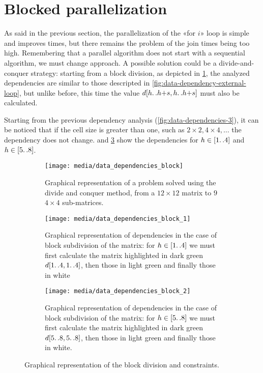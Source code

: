 \section{Blocked parallelization}\label{blocked_parallelization}

As said in the previous section, the parallelization of the «for \(i\)» loop is simple and improves times, but there remains the problem of the join times being too high. 
Remembering that a parallel algorithm does not start with a sequential algorithm, we must change approach.
A possible solution could be a divide-and-conquer strategy: starting from a block division, as depicted in \cref{fig:submatrix}, the analyzed dependencies are similar to those descripted in \cref{fig:data-dependency-external-loop}, but unlike before, this time the value \(d[h{\mathinner {\ldotp \ldotp}}h{+}s,h{\mathinner {\ldotp \ldotp}}h{+}s]\) must also be calculated.

Starting from the previous dependency analysis (\cref{fig:data-dependencies-3}), it can be noticed that if the cell size is greater than one, such as  \(  2 \times 2,  4 \times 4, \dots\) the dependency does not change.
 and \ref{fig:data-dependencies-block-2} show the dependencies for \(h \in [1{\mathinner {\ldotp \ldotp}}4]\) and \(h \in [5{\mathinner {\ldotp \ldotp}}8]\).

\begin{figure}[htbp]
    \centering
    \begin{subfigure}[t]{0.3\textwidth}
        \texttt{[image: media/data\_dependencies\_block]}
        \caption{Graphical representation of a problem solved using the divide and conquer method, from a \(12\times 12\) matrix to \(9\) \(4\times 4\) sub-matrices.}
        \label{fig:submatrix}
    \end{subfigure}
    \hfill
    \begin{subfigure}[t]{0.3\textwidth}
        \texttt{[image: media/data\_dependencies\_block\_1]}
        \caption{Graphical representation of dependencies in the case of block subdivision of the matrix: for \(h \in [1{\mathinner {\ldotp \ldotp}}4]\) we must first calculate the matrix highlighted in dark green \(d[1{\mathinner {\ldotp \ldotp}}4,1{\mathinner {\ldotp \ldotp}}4]\), then those in light green and finally those in white}
        \label{fig:data-dependencies-block-1}
    \end{subfigure}
    \hfill
    \begin{subfigure}[t]{0.3\textwidth}
        \texttt{[image: media/data\_dependencies\_block\_2]}
        \caption{Graphical representation of dependencies in the case of block subdivision of the matrix: for \(h \in [5{\mathinner {\ldotp \ldotp}}8]\) we must first calculate the matrix highlighted in dark green \(d[5{\mathinner {\ldotp \ldotp}}8,5{\mathinner {\ldotp \ldotp}}8]\), then those in light green and finally those in white.}
        \label{fig:data-dependencies-block-2}
    \end{subfigure}
    \caption{Graphical representation of the block division and constraints.}
    \label{fig:data-representation-of-the-block-division-and-constraints}
\end{figure}

